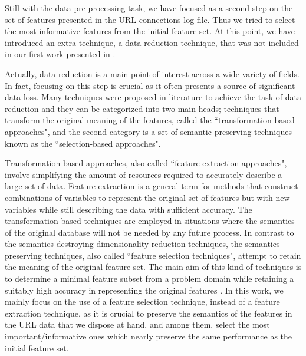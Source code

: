 \documentclass{llncs}
\begin{document}
Still with the data pre-processing task, we have focused as a second
step on %
 the set of features presented in the URL connections log file. Thus
 we tried to select the most informative features from the initial
 feature set. At this point, we have introduced an extra technique, a
 data reduction technique, that was not included in our first work
 presented in \cite{ECTA}.  

Actually, data reduction is a main point of interest across a wide variety of fields. In fact, focusing on this step is crucial as it often presents a source of significant data loss. Many techniques were proposed in literature to achieve the task of data reduction and they can be categorized into two main heads; techniques that transform the original meaning of the features, called the ``transformation-based approaches", and the second category is a set of semantic-preserving techniques known as the ``selection-based approaches".

Transformation based approaches, also called ``feature extraction approaches", involve simplifying the amount of resources required to accurately describe a large set of data. Feature extraction is a general term for methods that construct combinations of variables to represent the original set of features but with new variables while still describing the data with sufficient accuracy. The transformation based techniques are employed in situations where the semantics of the original database will not be needed by any future process. In contrast to the semantics-destroying dimensionality reduction techniques, the semantics-preserving techniques, also called ``feature selection techniques", attempt to retain the meaning of the original feature set. The main aim of this kind of techniques is to determine a minimal feature subset from a problem domain while retaining a suitably high accuracy in representing the original features \cite{liu1998feature}. In this work, we mainly focus on the use of a feature selection technique, instead of a feature extraction technique, as it is crucial to preserve the semantics of the features in the URL data that we dispose at hand, and among them, select the most important/informative ones which nearly preserve  the same performance as the initial feature set.
\end{document}
